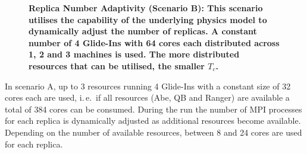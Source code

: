 \documentclass{rspublic}
\newcommand{\alnote}[1]{ {\textcolor{blue} { ***AL: #1 }}}
\newcommand{\jhanote}[1]{ {\textcolor{red} { ***SJ: #1 }}}
\newcommand{\alnote}[1]{}
\newcommand{\jhanote}[1]{}
\begin{document}
\begin{figure}[h]
\begin{minipage}[t]{.485\textwidth}
\begin{center}
      \caption{\footnotesize \bf Replica Number Adaptivity (Scenario
        B): This scenario utilises the capability of the underlying
        physics model to dynamically adjust the number of replicas.  A
        constant number of 4 Glide-Ins with 64 cores each distributed
        across 1, 2 and 3 machines is used.  The more distributed
        resources that can be utilised, the smaller $T_{c}$.}
      \label{fig:performance_perf_distributed_B}
    \end{center}
  \end{minipage}
  \hfill
\end{figure}

                     
In scenario A, up to 3 resources running 4 Glide-Ins with a constant
size of 32 cores each are used, i.\,e.\ if all resources (Abe, QB and Ranger) are
available a total of 384 cores can be consumed.  During the run the
number of MPI processes for each replica is dynamically adjusted as
additional resources become available. Depending on the number of
available resources, between 8 and 24 cores are used for each replica.
\end{document}
